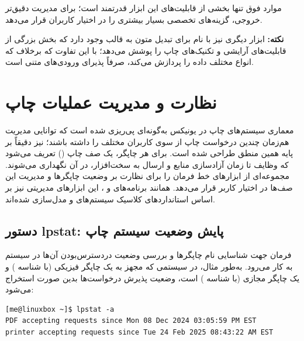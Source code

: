 \begin{longtable}{>{\raggedright\arraybackslash}p{} p{}}
\end{longtable}

موارد فوق تنها بخشی از قابلیت‌های این ابزار قدرتمند است؛  برای مدیریت دقیق‌تر خروجی، گزینه‌های تخصصی بسیار بیشتری را در اختیار کاربران قرار می‌دهد.

\begin{note}
\textbf{نکته:} ابزار دیگری نیز با نام  برای تبدیل متون به قالب  وجود دارد که بخش بزرگی از قابلیت‌های آرایشی و تکنیک‌های چاپ  را پوشش می‌دهد؛ با این تفاوت که برخلاف  که انواع مختلف داده را پردازش می‌کند،  صرفاً پذیرای ورودی‌های متنی است.
\end{note}

\section{نظارت و مدیریت عملیات چاپ}

معماری سیستم‌های چاپ در یونیکس به‌گونه‌ای پی‌ریزی شده است که توانایی مدیریت هم‌زمان چندین درخواست چاپ از سوی کاربران مختلف را داشته باشند؛  نیز دقیقاً بر پایه همین منطق طراحی شده است. برای هر چاپگر، یک صف چاپ () تعریف می‌شود که وظایف تا زمان آزادسازی منابع و ارسال به سخت‌افزار، در آن نگهداری می‌شوند.  مجموعه‌ای از ابزارهای خط فرمان را برای نظارت بر وضعیت چاپگرها و مدیریت این صف‌ها در اختیار کاربر قرار می‌دهد. همانند برنامه‌های  و ، این ابزارهای مدیریتی نیز بر اساس استانداردهای کلاسیک سیستم‌های  و  مدل‌سازی شده‌اند.

\subsection{دستور lpstat: پایش وضعیت سیستم چاپ}

فرمان  جهت شناسایی نام چاپگرها و بررسی وضعیت دردسترس‌بودن آن‌ها در سیستم به کار می‌رود. به‌طور مثال، در سیستمی که مجهز به یک چاپگر فیزیکی (با شناسه ) و یک چاپگر مجازی  (با شناسه ) است، وضعیت پذیرش درخواست‌ها بدین صورت استخراج می‌شود:

\begin{latin}
\begin{lstlisting}
[me@linuxbox ~]$ lpstat -a
PDF accepting requests since Mon 08 Dec 2024 03:05:59 PM EST
printer accepting requests since Tue 24 Feb 2025 08:43:22 AM EST
\end{lstlisting}
\end{latin}

